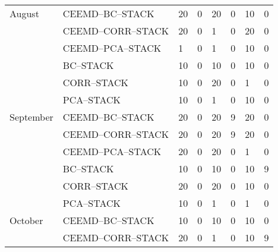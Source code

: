 \begin{tiny}
\begin{center}
\begin{longtable}[htb!]{llll|ll|ll}
August      & CEEMD--BC--STACK       & 20                & 0                & 20                & 0                & 10                & 0                \\
            & CEEMD--CORR--STACK     & 20                & 0                & 1                 & 0                & 20                & 0                \\
            & CEEMD--PCA--STACK      & 1                 & 0                & 1                 & 0                & 10                & 0                \\
            & BC--STACK              & 10                & 0                & 10                & 0                & 10                & 0                \\
            & CORR--STACK            & 10                & 0                & 20                & 0                & 1                 & 0                \\
            & PCA--STACK             & 10                & 0                & 1                 & 0                & 10                & 0                \\ \hline
September   & CEEMD--BC--STACK       & 20                & 0                & 20                & 9                & 20                & 0                \\
            & CEEMD--CORR--STACK     & 20                & 0                & 20                & 9                & 20                & 0                \\
            & CEEMD--PCA--STACK      & 20                & 0                & 20                & 0                & 1                 & 0                \\
            & BC--STACK              & 10                & 0                & 10                & 0                & 10                & 9                \\
            & CORR--STACK            & 20                & 0                & 20                & 0                & 10                & 0                \\
            & PCA--STACK             & 10                & 0                & 1                 & 0                & 1                 & 0                \\ \hline
October     & CEEMD--BC--STACK       & 10                & 0                & 10                & 0                & 10                & 0                \\
            & CEEMD--CORR--STACK     & 20                & 0                & 1                 & 0                & 10                & 9                \\

\end{longtable}
\end{center}
\end{tiny}
